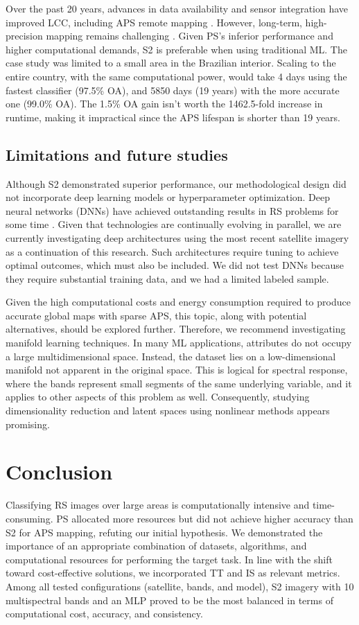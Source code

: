 \documentclass[journal]{IEEEtran}
\begin{document}
Over the past 20 years, advances in data availability and sensor integration have improved LCC, including APS remote mapping \cite{Veettil2023}. However, long-term, high-precision mapping remains challenging \cite{Georganos2018, Zhang2025}. Given PS's inferior performance and higher computational demands, S2 is preferable when using traditional ML. The case study was limited to a small area in the Brazilian interior. Scaling to the entire country, with the same computational power, would take 4 days using the fastest classifier (97.5\% OA), and 5850 days (19 years) with the more accurate one (99.0\% OA). The 1.5\% OA gain isn't worth the 1462.5-fold increase in runtime, making it impractical since the APS lifespan is shorter than 19 years.

\subsection{Limitations and future studies}
Although S2 demonstrated superior performance, our methodological design did not incorporate deep learning models or hyperparameter optimization. Deep neural networks (DNNs) have achieved outstanding results in RS problems for some time \cite{Zhang2025}. Given that technologies are continually evolving in parallel, we are currently investigating deep architectures using the most recent satellite imagery as a continuation of this research. Such architectures require tuning to achieve optimal outcomes, which must also be included. We did not test DNNs because they require substantial training data, and we had a limited labeled sample.

Given the high computational costs and energy consumption required to produce accurate global maps with sparse APS, this topic, along with potential alternatives, should be explored further. Therefore, we recommend investigating manifold learning techniques. In many ML applications, attributes do not occupy a large multidimensional space. Instead, the dataset lies on a low-dimensional manifold not apparent in the original space. This is logical for spectral response, where the bands represent small segments of the same underlying variable, and it applies to other aspects of this problem as well. Consequently, studying dimensionality reduction and latent spaces using nonlinear methods appears promising.

\section{Conclusion}
Classifying RS images over large areas is computationally intensive and time-consuming. PS allocated more resources but did not achieve higher accuracy than S2 for APS mapping, refuting our initial hypothesis. We demonstrated the importance of an appropriate combination of datasets, algorithms, and computational resources for performing the target task. In line with the shift toward cost-effective solutions, we incorporated TT and IS as relevant metrics. Among all tested configurations (satellite, bands, and model), S2 imagery with 10 multispectral bands and an MLP proved to be the most balanced in terms of computational cost, accuracy, and consistency.
\end{document}
